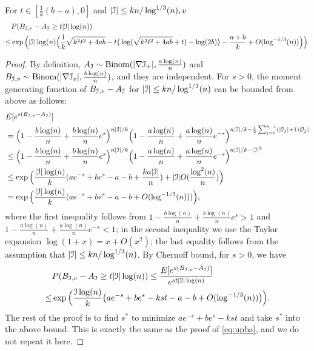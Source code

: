 \documentclass{article}
\begin{document}
\begin{proposition}
For $t\in [\frac{1}{k}(b-a), 0]$
and $|\mathcal{I}|\le kn/\log^{1/3}(n),v$
\begin{equation} \label{eq:upmpt}
\begin{aligned}
& P(B_{\mathcal{I},v}-A_{\mathcal{I}}\ge t|\mathcal{I}|\log(n))  \\
\le & \exp\Big(|\mathcal{I}|\log(n)
\Big(\frac{1}{k}\sqrt{k^2 t^2 + 4ab} -t\big(\log(\sqrt{k^2 t^2 + 4ab}+t)-\log(2b) \big) -\frac{a+b}{k} 
+ O(\log^{-1/3}(n)) \Big)\Big) .
\end{aligned}
\end{equation}
\end{proposition}
\begin{proof}
By definition, $A_{\mathcal{I}}\sim\operatorname{Binom}(|\nabla\mathcal{I}_+|,\frac{a\log(n)}{n})$ and $B_{\mathcal{I},v}\sim\operatorname{Binom}(|\nabla\mathcal{I}_v|,\frac{b\log(n)}{n})$, and they are independent. For $s>0$, the moment generating function of $B_{\mathcal{I},v}-A_{\mathcal{I}}$ for $|\mathcal{I}|\le kn/\log^{1/3}(n)$ can be bounded from above as follows:
\begin{align*}
& E[e^{s(B_{\mathcal{I},v}-A_{\mathcal{I}})}] \\
& =\Big(1-\frac{b\log(n)}{n}+\frac{b\log(n)}{n} e^s \Big)^{n|\mathcal{I}|/k
}
\Big(1-\frac{a\log(n)}{n}+\frac{a\log(n)}{n} e^{-s} \Big)^{n |\mathcal{I}|/k-\frac{1}{2}\sum_{j=0}^{k-1}(|\mathcal{I}_j|+1)|\mathcal{I}_j| }  \\
& \le 
\Big(1-\frac{b\log(n)}{n}+\frac{b\log(n)}{n} e^s \Big)^{n|\mathcal{I}|/k}
\Big(1-\frac{a\log(n)}{n}+\frac{a\log(n)}{n} e^{-s} \Big)^{n |\mathcal{I}|/k-|\mathcal{I}|^2}
 \\
& \le
\exp\Big(\frac{|\mathcal{I}|\log(n)}{k}(a e^{-s}+b e^s-a-b +\frac{ka|\mathcal{I}|}{n})
+|\mathcal{I}|O(\frac{\log^2(n)}{n})\Big) \\
& =
\exp\Big(\frac{|\mathcal{I}|\log(n)}{k}(a e^{-s}+b e^s-a-b +
O(\log^{-1/3}(n))) \Big),
\end{align*}
where the first inequality follows from $1-\frac{b\log(n)}{n}+\frac{b\log(n)}{n} e^s>1$ and $1-\frac{a\log(n)}{n}+\frac{a\log(n)}{n} e^{-s}<1$; in the second inequality we use the Taylor expansion $\log(1+x)=x+O(x^2)$; the last equality follows from the assumption that $|\mathcal{I}|\le kn/\log^{1/3}(n)$.
By Chernoff bound, for $s>0$, we have
\begin{align*} 
& P(B_{\mathcal{I},v}-A_{\mathcal{I}}\ge t|{\mathcal{I}}|\log(n))\le
\frac{E[e^{s(B_{\mathcal{I},v}-A_{\mathcal{I}})}]}{e^{st|{\mathcal{I}}|\log(n)}}  \\
\le & \exp\Big(\frac{{\mathcal{I}}\log(n)}{k} \big(a e^{-s}+b e^s -kst -a-b
 + O(\log^{-1/3}(n)) \big)\Big)  .
\end{align*}
The rest of the proof is to find $s^\ast$ to minimize $a e^{-s}+b e^s -kst$ and take $s^\ast$ into the above bound. This is exactly the same as the proof of \eqref{eq:upba}, and we do not repeat it here.
\end{proof}
\end{document}

